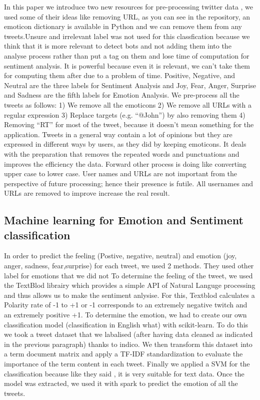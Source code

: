 \documentclass{acmtog} %
\begin{document}
In this paper we introduce two new resources for pre-processing twitter data \cite{Jianqiang17}, we used some of their ideas like removing URL, as you can see in the repository, an emoticon dictionary is available in Python and we can remove them from any tweets.Unsure and irrelevant label was not used for this classfication \citep{Poddar16} because we think that it is more relevant to detect bots and not adding them into the analyse process rather than put a tag on them and lose time of computation for sentiment analysis. It is powerful because even it is relevant, we can’t take them for computing them after due to a problem of time. Positive, Negative, and Neutral are the three labels for Sentiment Analysis and Joy, Fear, Anger, Surprise and Sadness are the fifth labels for Emotion Analysis. We pre-process all the tweets as follows:
1) We remove all the emoticons
2) We remove all URLs with a regular expression 
3) Replace targets (e.g. “@John”) by also removing them
4) Removing “RT” for most of the tweet, because it doesn’t mean something for the application. 
Tweets in a general way contain a lot of opinions but they are expressed in different ways by users, as they did \cite{Rebecca11} by keeping emoticons. It deals with the preparation that removes the repeated words and punctuations and improves the efficiency the data. Forward other process is doing like converting upper case to lower case. User names and URLs are not important from the perspective of future processing; hence their presence is futile. All usernames and URLs are removed to improve increase the real result. 



\subsection{Machine learning for Emotion and Sentiment classification}
\label{subsub:ml}

In order to predict the feeling (Postive, negative, neutral) and emotion (joy, anger, sadness, fear,surprise) for each tweet, we used 2 methods. They used other label for emotions that we did not 
To determine the feeling of the tweet, we used the TextBlod librairy which provides a simple API of Natural Languge processing and thus allows us to make the sentiment anlysise. For this, Textblod calculates a Polarity rate of -1 to +1 or -1 corresponds to an extremely negative twitch and an extremely positive +1.
To determine the emotion, we had to create our own classification model (classification in English what) with scikit-learn.
To do this we took a tweet dataset that we labalised (after having data cleaned as indicated in the previous paragraph) thanks to indico.
We then transform this dataset into a term document matrix and apply a TF-IDF standardization to evaluate the importance of the term content in each tweet.
Finally we applied a SVM for the classification because like they said \cite{Medhat14}, it is very suitable for text data.
Once the model was extracted, we used it with spark to predict the emotion of all the tweets.
\end{document}
